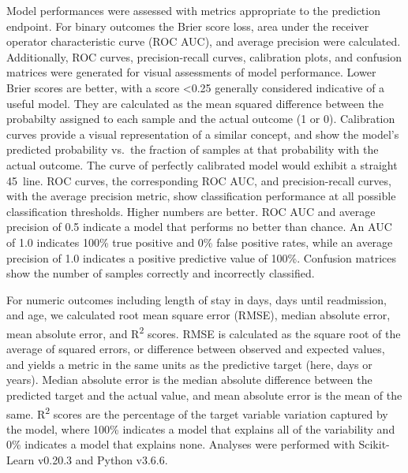 Model performances were assessed with metrics appropriate to the prediction endpoint.\@ 
For binary outcomes %
the Brier score loss, area under the receiver operator characteristic curve (ROC AUC), and average precision were calculated.\@
Additionally, ROC curves, precision-recall curves, calibration plots, and confusion matrices were generated for visual assessments of model performance.\@
Lower Brier scores are better, with a score <0.25 generally considered indicative of a useful model.\supercite{Steyerberg2010}\@
They are calculated as the mean squared difference between the probabilty assigned to each sample and the actual outcome (1 or 0).\@
Calibration curves provide a visual representation of a similar concept, and show the model's predicted probability vs.\ 
the fraction of samples at that probability with the actual outcome.\@ 
The curve of perfectly calibrated model would exhibit a straight 45\degree\ line.\@
ROC curves, the corresponding ROC AUC, and precision-recall curves, with the average precision metric, show classification performance 
at all possible classification thresholds.\supercite{pencina2015evaluating} Higher numbers are better.\@
ROC AUC and average precision of 0.5 indicate a model that performs no better than chance.\@
An AUC of 1.0 indicates 100\% true positive and 0\% false positive rates, 
while an average precision of 1.0 indicates a positive predictive value of 100\%.\@
Confusion matrices show the number of samples correctly and incorrectly classified.\@

For numeric outcomes including length of stay in days, days until readmission, and age, we calculated
root mean square error (RMSE), median absolute error, mean absolute error, and R\textsuperscript{2} scores.\@
RMSE is calculated as the square root of the average of squared errors, or difference between observed and expected values, 
and yields a metric in the same units as the predictive target (here, days or years).\supercite{chai2014root}\@
Median absolute error is the median absolute difference between the predicted target and the actual value,
and mean absolute error is the mean of the same.\@
R\textsuperscript{2} scores are the percentage of the target variable variation captured by the model, where 100\% indicates
a model that explains all of the variability and 0\% indicates a model that explains none.\@ %
Analyses were performed with Scikit-Learn v0.20.3\supercite{scikit-learn} and Python v3.6.6.\@
